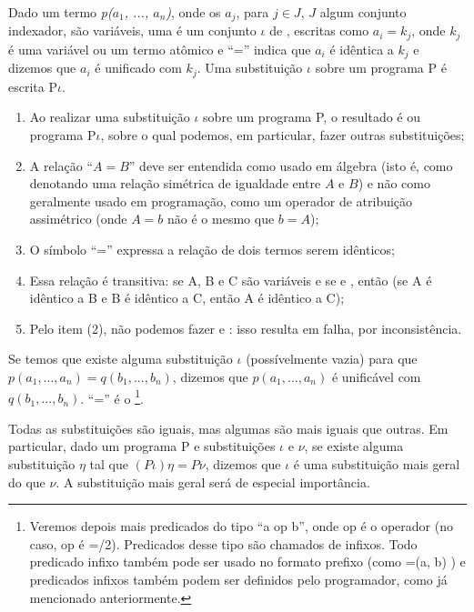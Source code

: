 \documentclass{article}
\begin{document}
\begin{definition} Dado um termo {\it p($a_1$, ..., $a_n$)}, onde os $a_j$, para $j \in J$, $J$ algum conjunto indexador, são variáveis, uma  é um conjunto $\iota$ de , escritas como $a_i = k_j$, onde $k_j$ é uma variável ou um termo atômico e ``='' indica que $a_i$ é idêntica a $k_j$ e dizemos que $a_i$ é unificado com $k_j$.
  Uma substituição $\iota$ sobre um programa P é escrita P$\iota$.
\end{definition}

\begin{remark}
  \hfill
  \begin{enumerate}
    \item Ao realizar uma substituição $\iota$ sobre um programa P, o resultado é ou programa P$\iota$, sobre o qual podemos, em particular, fazer outras substituições;
    \item A relação ``$A = B$'' deve ser entendida como usado em álgebra (isto é, como denotando uma relação simétrica de igualdade entre $A$ e $B$) e não como geralmente usado em programação, como um operador de atribuição assimétrico (onde $A = b$ não é o mesmo que $b = A$);
    \item O símbolo ``='' expressa a relação de dois termos serem idênticos;
    \item Essa relação é transitiva: se A, B e C são variáveis e se  e , então  (se A é idêntico a B e B é idêntico a C, então A é idêntico a C);
    \item Pelo item (2), não podemos fazer  e : isso resulta em falha, por inconsistência.
  \end{enumerate}
\end{remark}

Se temos que existe alguma substituição $\iota$ (possívelmente vazia) para que $p(a_1, ..., a_n) = q(b_1, ..., b_n)$, dizemos que  $p(a_1, ..., a_n)$ é unificável com $q(b_1, ..., b_n)$. ``='' é o \footnote{Veremos depois mais
  predicados do tipo ``a op b'', onde op é o operador (no caso, op é =/2). Predicados desse tipo são chamados de infixos. Todo predicado infixo também pode ser usado no formato prefixo (como =(a, b) ) e predicados infixos também podem ser definidos pelo programador, como já mencionado anteriormente.}.

Todas as substituições são iguais, mas algumas são mais iguais que outras. Em particular, dado um programa P e substituições $\iota$ e $\nu$, se existe alguma substituição $\eta$ tal que $(P\iota)\eta = P \nu$, dizemos que $\iota$ é uma substituição mais geral do que $\nu$. A substituição mais geral será de especial importância.
\end{document}
